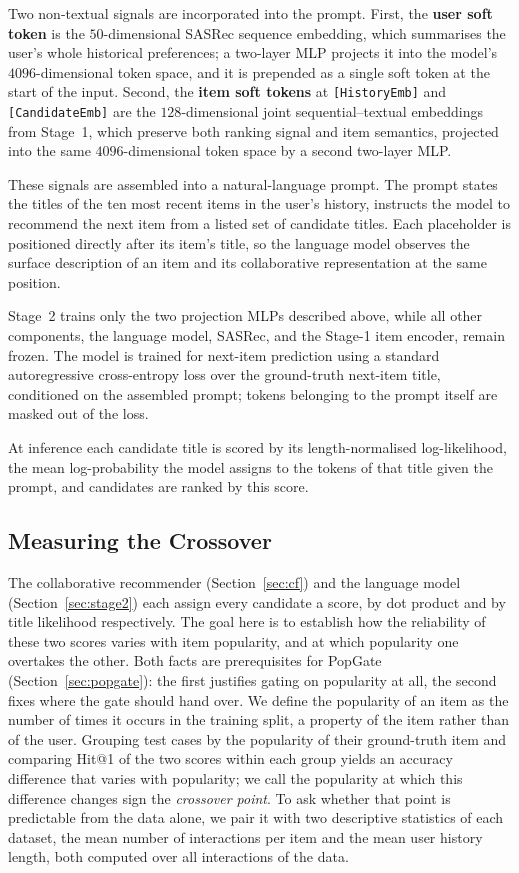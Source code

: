 \documentclass[runningheads]{llncs}
\begin{document}
Two non-textual signals are incorporated into the prompt. First, the \textbf{user
soft token} is the $50$-dimensional SASRec sequence embedding, which summarises the
user's whole historical preferences; a two-layer MLP projects it into the model's
$4096$-dimensional token space, and it is prepended as a single soft token at the
start of the input. Second, the \textbf{item soft tokens} at \texttt{[HistoryEmb]} and
\texttt{[CandidateEmb]} are the $128$-dimensional joint sequential--textual embeddings
from Stage~1, which preserve both ranking signal and item semantics, projected into
the same $4096$-dimensional token space by a second two-layer MLP.

These signals are assembled into a natural-language prompt. The prompt states the
titles of the ten most recent items in the user's history, instructs the model to
recommend the next item from a listed set of candidate titles. Each placeholder is positioned directly
after its item's title, so the language model observes the surface description of an
item and its collaborative representation at the same position.

Stage~2 trains only the two projection MLPs described above, while all other
components, the language model, SASRec, and the Stage-1 item encoder, remain frozen.
The model is trained for next-item prediction using a standard autoregressive
cross-entropy loss over the ground-truth next-item title, conditioned on the assembled
prompt; tokens belonging to the prompt itself are masked out of the loss.

At inference each candidate title is scored
by its length-normalised log-likelihood, the mean log-probability the model assigns to
the tokens of that title given the prompt, and candidates are ranked by this score.

\subsection{Measuring the Crossover}
\label{sec:crossover-method}

The collaborative recommender (Section~\ref{sec:cf}) and the language model
(Section~\ref{sec:stage2}) each assign every candidate a score, by dot product and by
title likelihood respectively. The goal here is to establish how the reliability of
these two scores varies with item popularity, and at which popularity one overtakes
the other. Both facts are prerequisites for PopGate (Section~\ref{sec:popgate}): the
first justifies gating on popularity at all, the second fixes where the gate should
hand over. We define the popularity of an item as the number of times it occurs in the
training split, a property of the item rather than of the user. Grouping test cases by the
popularity of their ground-truth item and comparing Hit@1 of the two scores within
each group yields an accuracy difference that varies with popularity; we call the
popularity at which this difference changes sign the \emph{crossover point}. To ask
whether that point is predictable from the data alone, we pair it with two descriptive
statistics of each dataset, the mean number of interactions per item and the mean user
history length, both computed over all interactions of the data.
\end{document}
